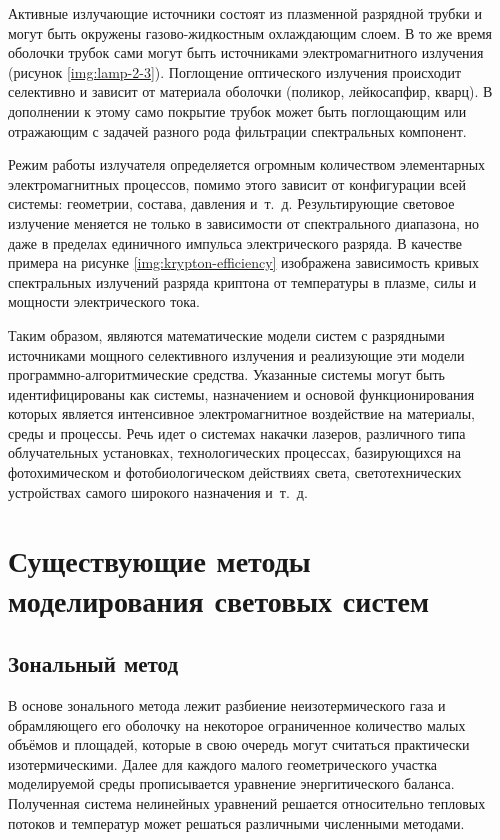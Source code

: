Активные излучающие источники состоят из плазменной разрядной трубки и могут быть окружены газово-жидкостным охлаждающим слоем.
В то же время оболочки трубок сами могут быть источниками электромагнитного излучения (рисунок \ref{img:lamp-2-3}).
Поглощение оптического излучения происходит селективно и зависит от материала оболочки (поликор, лейкосапфир, кварц).
В дополнении к этому само покрытие трубок может быть поглощающим или отражающим с задачей разного рода фильтрации спектральных компонент.

Режим работы излучателя определяется огромным количеством элементарных электромагнитных процессов, помимо этого зависит от конфигурации всей системы: геометрии, состава, давления и~т.~д.
Результирующие световое излучение меняется не только в зависимости от спектрального диапазона, но даже в пределах единичного импульса электрического разряда.
В качестве примера на рисунке \ref{img:krypton-efficiency} изображена зависимость кривых спектральных излучений разряда криптона от температуры в плазме, силы и мощности электрического тока.

Таким образом,  являются математические модели систем с разрядными источниками мощного селективного излучения и реализующие эти модели программно-алгоритмические средства.
Указанные системы могут быть идентифицированы как системы, назначением и основой функционирования которых является интенсивное электромагнитное воздействие на материалы, среды и процессы.
Речь идет о системах накачки лазеров, различного типа облучательных установках, технологических процессах, базирующихся на фотохимическом и фотобиологическом действиях света, светотехнических устройствах самого широкого назначения и~т.~д.

\section{Существующие методы моделирования световых систем}

\subsection{Зональный метод}

В основе зонального метода лежит разбиение неизотермического газа и обрамляющего его оболочку на некоторое ограниченное количество малых объёмов и площадей, которые в свою очередь могут считаться практически изотермическими.
Далее для каждого малого геометрического участка моделируемой среды прописывается уравнение энергитического баланса.
Полученная система нелинейных уравнений решается относительно тепловых потоков и температур может решаться различными численными методами.

